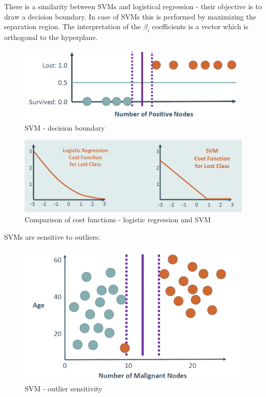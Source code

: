 \documentclass[11pt]{book}
\begin{document}
There is a similarity between SVMs and logistical regression - their objective is to draw a decision boundary. In case of SVMs this is performed by maximizing the separation region. The interpretation of the $\beta_i$ coefficients is a vector which is orthogonal to the hyperplane.

\begin{figure}[H]
    \centering
    \includegraphics[width=\linewidth]{svm_plot.PNG}
    \caption{SVM - decision boundary}
    \label{}
\end{figure}

\begin{figure}[H]
    \centering
    \includegraphics[width=\linewidth]{svmvslr.PNG}
    \caption{Comparison of cost functions - logistic regression and SVM}
    \label{fig:my_label}
\end{figure}

SVMs are sensitive to outliers:

\begin{figure}[H]
    \centering
    \includegraphics[width=0.5\linewidth]{svm_sens.PNG}
    \caption{SVM - outlier sensitivity}
    \label{fig:my_label}
\end{figure}
\end{document}

